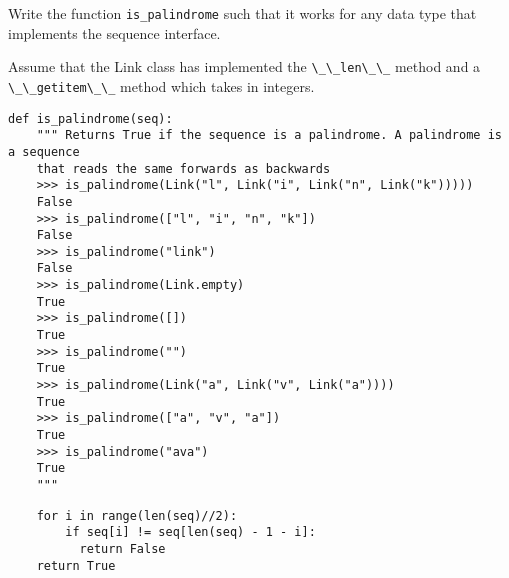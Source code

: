 \question Write the function {\tt is\_palindrome} such that it works for any data type that 
implements the sequence interface. 

Assume that the Link class has implemented the \lstinline{\_\_len\_\_} method and a \lstinline{\_\_getitem\_\_} 
method which takes in integers.

\begin{lstlisting}
def is_palindrome(seq):
    """ Returns True if the sequence is a palindrome. A palindrome is a sequence 
    that reads the same forwards as backwards
    >>> is_palindrome(Link("l", Link("i", Link("n", Link("k")))))
    False
    >>> is_palindrome(["l", "i", "n", "k"])
    False
    >>> is_palindrome("link")
    False
    >>> is_palindrome(Link.empty)
    True
    >>> is_palindrome([])
    True
    >>> is_palindrome("")
    True
    >>> is_palindrome(Link("a", Link("v", Link("a"))))
    True
    >>> is_palindrome(["a", "v", "a"])
    True
    >>> is_palindrome("ava")
    True
    """
\end{lstlisting}
\begin{solution}[1in]
\begin{lstlisting}
    for i in range(len(seq)//2):
        if seq[i] != seq[len(seq) - 1 - i]:
          return False
    return True
\end{lstlisting}
\end{solution}
